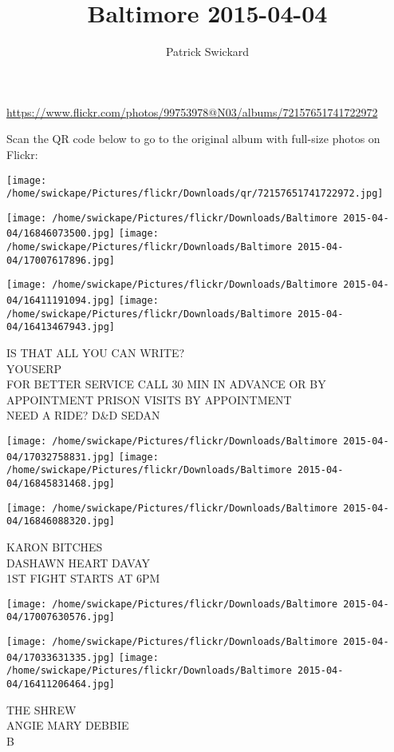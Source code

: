 \documentclass[10pt,letterpaper]{article}
\title{Baltimore 2015-04-04}
\author{Patrick Swickard}
\date{}
\begin{document}
\maketitle

\url{https://www.flickr.com/photos/99753978@N03/albums/72157651741722972}

Scan the QR code below to go to the original album with full-size photos on Flickr:

\texttt{[image: /home/swickape/Pictures/flickr/Downloads/qr/72157651741722972.jpg]}
\pagebreak

\texttt{[image: /home/swickape/Pictures/flickr/Downloads/Baltimore 2015-04-04/16846073500.jpg]}
\texttt{[image: /home/swickape/Pictures/flickr/Downloads/Baltimore 2015-04-04/17007617896.jpg]}

\texttt{[image: /home/swickape/Pictures/flickr/Downloads/Baltimore 2015-04-04/16411191094.jpg]}
\texttt{[image: /home/swickape/Pictures/flickr/Downloads/Baltimore 2015-04-04/16413467943.jpg]}

IS THAT ALL YOU CAN WRITE?\\
YOUSERP\\
FOR BETTER SERVICE CALL 30 MIN IN ADVANCE OR BY APPOINTMENT PRISON VISITS BY APPOINTMENT\\
NEED A RIDE?  D\&D SEDAN
\pagebreak

\texttt{[image: /home/swickape/Pictures/flickr/Downloads/Baltimore 2015-04-04/17032758831.jpg]}
\texttt{[image: /home/swickape/Pictures/flickr/Downloads/Baltimore 2015-04-04/16845831468.jpg]}

\texttt{[image: /home/swickape/Pictures/flickr/Downloads/Baltimore 2015-04-04/16846088320.jpg]}

KARON BITCHES\\
DASHAWN HEART DAVAY\\
1ST FIGHT STARTS AT 6PM
\pagebreak

\texttt{[image: /home/swickape/Pictures/flickr/Downloads/Baltimore 2015-04-04/17007630576.jpg]}

\vspace{0.25in}
\texttt{[image: /home/swickape/Pictures/flickr/Downloads/Baltimore 2015-04-04/17033631335.jpg]}
\texttt{[image: /home/swickape/Pictures/flickr/Downloads/Baltimore 2015-04-04/16411206464.jpg]}

THE SHREW\\
ANGIE MARY DEBBIE\\
B
\pagebreak
\end{document}
